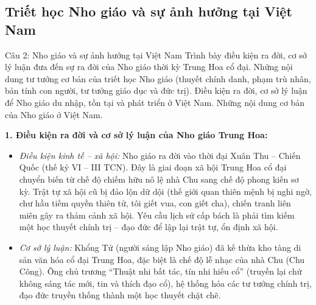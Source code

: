 \documentclass[12pt,a4paper]{article}
\begin{document}
\subsection{Triết học Nho giáo và sự ảnh hưởng tại Việt Nam}

\begin{questionbox}{Câu 2: Nho giáo và sự ảnh hưởng tại Việt Nam}
Trình bày điều kiện ra đời, cơ sở lý luận đưa đến sự ra đời của Nho giáo thời kỳ Trung Hoa cổ đại. Những nội dung tư tưởng cơ bản của triết học Nho giáo (thuyết chính danh, phạm trù nhân, bản tính con người, tư tưởng giáo dục và đức trị). Điều kiện ra đời, cơ sở lý luận để Nho giáo du nhập, tồn tại và phát triển ở Việt Nam. Những nội dung cơ bản của Nho giáo ở Việt Nam.
\end{questionbox}

\noindent
\textbf{1. Điều kiện ra đời và cơ sở lý luận của Nho giáo Trung Hoa:}
\begin{itemize}
    \item \textit{Điều kiện kinh tế -- xã hội:} Nho giáo ra đời vào thời đại Xuân Thu -- Chiến Quốc (thế kỷ VI -- III TCN). Đây là giai đoạn xã hội Trung Hoa cổ đại chuyển biến từ chế độ chiếm hữu nô lệ nhà Chu sang chế độ phong kiến sơ kỳ. Trật tự xã hội cũ bị đảo lộn dữ dội (thế giới quan thiên mệnh bị nghi ngờ, chư hầu tiếm quyền thiên tử, tôi giết vua, con giết cha), chiến tranh liên miên gây ra thảm cảnh xã hội. Yêu cầu lịch sử cấp bách là phải tìm kiếm một học thuyết chính trị -- đạo đức để lập lại trật tự, ổn định xã hội.
    \item \textit{Cơ sở lý luận:} Khổng Tử (người sáng lập Nho giáo) đã kế thừa kho tàng di sản văn hóa cổ đại Trung Hoa, đặc biệt là chế độ lễ nhạc của nhà Chu (Chu Công). Ông chủ trương ``Thuật nhi bất tác, tín nhi hiếu cổ'' (truyền lại chứ không sáng tác mới, tin và thích đạo cổ), hệ thống hóa các tư tưởng chính trị, đạo đức truyền thống thành một học thuyết chặt chẽ.
\end{itemize}
\end{document}
